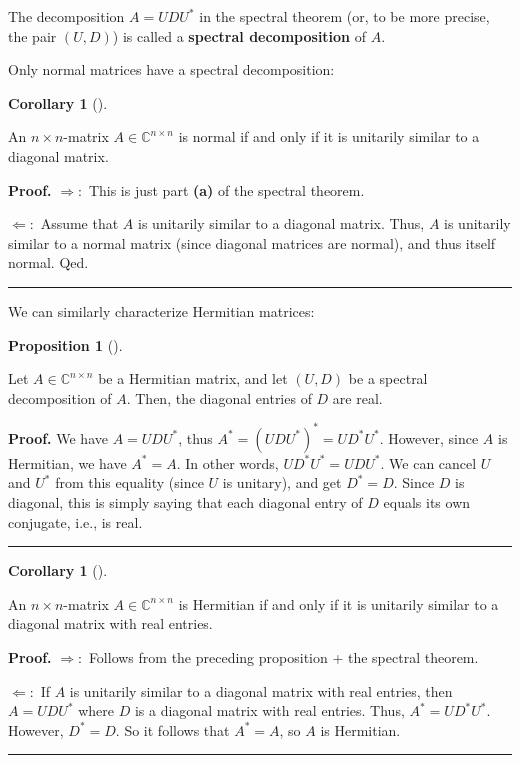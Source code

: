 \documentclass[numbers=enddot,12pt,final,onecolumn,notitlepage]{scrartcl}%
\numberwithin{exer}{subsection}
\theoremstyle{definition}
\newtheorem{prop}[theo]{Proposition}
\newenvironment{proposition}[1][]
{\begin{prop}[#1]\begin{leftbar}}
{\end{leftbar}\end{prop}}
\newtheorem{coro}[theo]{Corollary}
\newenvironment{corollary}[1][]
{\begin{coro}[#1]\begin{leftbar}}
{\end{leftbar}\end{coro}}
\newenvironment{proof}[1][Proof]{\noindent\textbf{#1.} }{\ \rule{0.5em}{0.5em}}
\begin{document}
The decomposition $A=UDU^{\ast}$ in the spectral theorem (or, to be more
precise, the pair $\left(  U,D\right)  $) is called a \textbf{spectral
decomposition} of $A$.

Only normal matrices have a spectral decomposition:

\begin{corollary}
An $n\times n$-matrix $A\in\mathbb{C}^{n\times n}$ is normal if and only if it
is unitarily similar to a diagonal matrix.
\end{corollary}

\begin{proof}
$\Longrightarrow:$ This is just part \textbf{(a)} of the spectral theorem.

$\Longleftarrow:$ Assume that $A$ is unitarily similar to a diagonal matrix.
Thus, $A$ is unitarily similar to a normal matrix (since diagonal matrices are
normal), and thus itself normal. Qed.
\end{proof}

We can similarly characterize Hermitian matrices:

\begin{proposition}
Let $A\in\mathbb{C}^{n\times n}$ be a Hermitian matrix, and let $\left(
U,D\right)  $ be a spectral decomposition of $A$. Then, the diagonal entries
of $D$ are real.
\end{proposition}

\begin{proof}
We have $A=UDU^{\ast}$, thus $A^{\ast}=\left(  UDU^{\ast}\right)  ^{\ast
}=UD^{\ast}U^{\ast}$. However, since $A$ is Hermitian, we have $A^{\ast}=A$.
In other words, $UD^{\ast}U^{\ast}=UDU^{\ast}$. We can cancel $U$ and
$U^{\ast}$ from this equality (since $U$ is unitary), and get $D^{\ast}=D$.
Since $D$ is diagonal, this is simply saying that each diagonal entry of $D$
equals its own conjugate, i.e., is real.
\end{proof}

\begin{corollary}
An $n\times n$-matrix $A\in\mathbb{C}^{n\times n}$ is Hermitian if and only if
it is unitarily similar to a diagonal matrix with real entries.
\end{corollary}

\begin{proof}
$\Longrightarrow:$ Follows from the preceding proposition + the spectral theorem.

$\Longleftarrow:$ If $A$ is unitarily similar to a diagonal matrix with real
entries, then $A=UDU^{\ast}$ where $D$ is a diagonal matrix with real entries.
Thus, $A^{\ast}=UD^{\ast}U^{\ast}$. However, $D^{\ast}=D$. So it follows that
$A^{\ast}=A$, so $A$ is Hermitian.
\end{proof}
\end{document}

